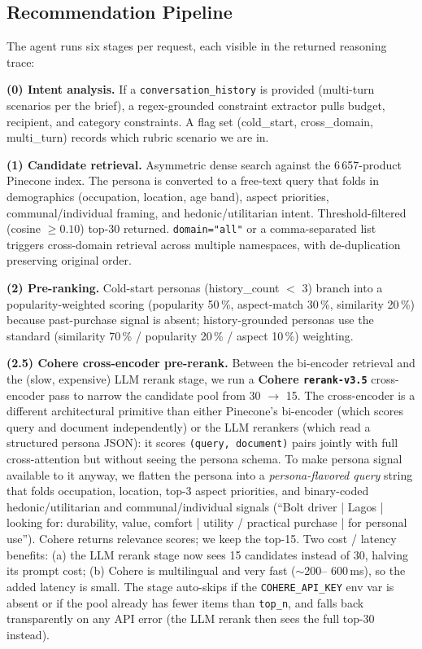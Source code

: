 \documentclass[sigconf,nonacm,balance]{acmart}
\begin{document}
\subsection{Recommendation Pipeline}

The agent runs six stages per request, each visible in the returned
reasoning trace:

\textbf{(0) Intent analysis.} If a \texttt{conversation\_history} is
provided (multi-turn scenarios per the brief), a regex-grounded
constraint extractor pulls budget, recipient, and category constraints.
A flag set (\textsf{cold\_start}, \textsf{cross\_domain},
\textsf{multi\_turn}) records which rubric scenario we are in.

\textbf{(1) Candidate retrieval.} Asymmetric dense search against the
6\,657-product Pinecone index. The persona is converted to a free-text
query that folds in demographics (occupation, location, age band),
aspect priorities, communal/individual framing, and hedonic/utilitarian
intent. Threshold-filtered (cosine $\geq 0.10$) top-30 returned.
\texttt{domain="all"} or a comma-separated list triggers cross-domain
retrieval across multiple namespaces, with de-duplication preserving
original order.

\textbf{(2) Pre-ranking.} Cold-start personas (\textsf{history\_count} $<$ 3)
branch into a popularity-weighted scoring (popularity 50\,\%, aspect-match
30\,\%, similarity 20\,\%) because past-purchase signal is absent;
history-grounded personas use the standard
(similarity 70\,\% / popularity 20\,\% / aspect 10\,\%) weighting.

\textbf{(2.5) Cohere cross-encoder pre-rerank.} Between the bi-encoder
retrieval and the (slow, expensive) LLM rerank stage, we run a
\textbf{Cohere \texttt{rerank-v3.5}} cross-encoder pass to narrow the
candidate pool from 30 $\to$ 15. The cross-encoder is a different
architectural primitive than either Pinecone's bi-encoder (which scores
query and document independently) or the LLM rerankers (which read a
structured persona JSON): it scores
\texttt{(query, document)} pairs jointly with full cross-attention but
without seeing the persona schema. To make persona signal available to
it anyway, we flatten the persona into a \emph{persona-flavored query}
string that folds occupation, location, top-3 aspect priorities, and
binary-coded hedonic/utilitarian and communal/individual signals
(``Bolt driver | Lagos | looking for: durability, value, comfort |
utility / practical purchase | for personal use''). Cohere returns
relevance scores; we keep the top-15. Two cost / latency benefits:
(a) the LLM rerank stage now sees 15 candidates instead of 30, halving
its prompt cost; (b) Cohere is multilingual and very fast ($\sim$200--
600\,ms), so the added latency is small. The stage auto-skips if the
\texttt{COHERE\_API\_KEY} env var is absent or if the pool already has
fewer items than \texttt{top\_n}, and falls back transparently on any
API error (the LLM rerank then sees the full top-30 instead).
\end{document}
